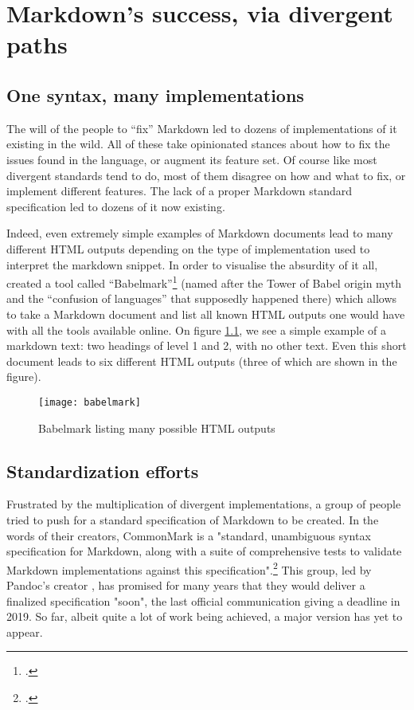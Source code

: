 \chapter{Markdown's success, via divergent paths}
\label{chap:proliferation}

\section{One syntax, many implementations}

The will of the people to ``fix'' Markdown led to dozens of implementations of it existing in the wild. All of these take opinionated stances
about how to fix the issues found in the language, or augment its feature set. Of course like most divergent standards tend to do, most of them
disagree on how and what to fix, or implement different features. The lack of a proper Markdown standard specification led to dozens of
it now existing.\newline

Indeed, even extremely simple examples of Markdown documents lead to many different HTML outputs depending on the type of implementation used
to interpret the markdown snippet. In order to visualise the absurdity of it all, \citeauthor{babelmark} created a tool called
``Babelmark''\footcite{babelmark} (named after the Tower of Babel origin myth and the ``confusion of languages'' that supposedly happened there)
which allows to take a Markdown document and list all known HTML outputs one would have with all the tools available online.
On figure \ref{fig:babelmark}, we see a simple example of a markdown text: two headings of level 1 and 2, with no other text.
Even this short document leads to six different HTML outputs (three of which are shown in the figure).

\begin{figure}[H]
\centering
\texttt{[image: babelmark]}
\caption{Babelmark listing many possible HTML outputs}
\label{fig:babelmark}
\end{figure}

\section{Standardization efforts}

Frustrated by the multiplication of divergent implementations, a group of people tried to push for a standard specification of Markdown to be created.
In the words of their creators, CommonMark is a "standard, unambiguous syntax specification for Markdown, along with a suite of comprehensive tests to
validate Markdown implementations against this specification".\footcite{commonmark} This group, led by Pandoc's creator \citeauthor{pandoc}, has promised
for many years that they would deliver a finalized specification "soon", the last official communication giving a deadline in 2019.
So far, albeit quite a lot of work being achieved, a major version has yet to appear.

